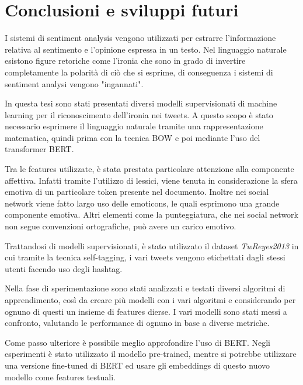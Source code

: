 \documentclass[oneside]{book}
\begin{document}
\chapter{Conclusioni e sviluppi futuri}
I sistemi di sentiment analysis vengono utilizzati per estrarre l'informazione relativa al sentimento e l'opinione espressa in un testo. Nel linguaggio naturale esistono figure retoriche come l'ironia che sono in grado di invertire completamente la polarità di ciò che si esprime, di conseguenza i sistemi di sentiment analysi vengono "ingannati".

In questa tesi sono stati presentati diversi modelli supervisionati di machine learning per il riconoscimento dell'ironia nei tweets. A questo scopo è stato necessario esprimere il linguaggio naturale tramite una rappresentazione matematica, quindi prima con la tecnica BOW e poi mediante l'uso del transformer BERT.

Tra le features utilizzate, è stata prestata particolare attenzione alla componente affettiva. Infatti tramite l'utilizzo di lessici, viene tenuta in considerazione la sfera emotiva di un particolare token presente nel documento. Inoltre nei social network viene fatto largo uso delle emoticons, le quali esprimono una grande componente emotiva. Altri elementi come la punteggiatura, che nei social network non segue convenzioni ortografiche, può avere un carico emotivo.

Trattandosi di modelli supervisionati, è stato utilizzato il dataset \textit{TwReyes2013} in cui tramite la tecnica self-tagging, i vari tweets vengono etichettati dagli stessi utenti facendo uso degli hashtag.

Nella fase di sperimentazione sono stati analizzati e testati diversi algoritmi di apprendimento, così da creare più modelli con i vari algoritmi e considerando per ognuno di questi un insieme di features dierse. I vari modelli sono stati messi a confronto, valutando le performance di ognuno in base a diverse metriche.

Come passo ulteriore è possibile meglio approfondire l'uso di BERT. Negli esperimenti è stato utilizzato il modello pre-trained, mentre si potrebbe utilizzare una versione fine-tuned di BERT ed usare gli embeddings di questo nuovo modello come features testuali.





\end{document}
